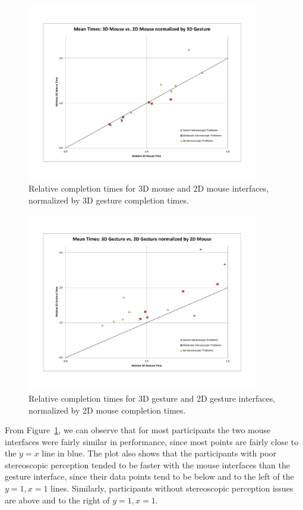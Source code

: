 \documentclass[pageno]{jpaper}
\begin{document}
\begin{figure}
\centering
\includegraphics[width=0.9\textwidth]{figures/f1.pdf}
\caption{Relative completion times for 3D mouse and 2D mouse interfaces,
normalized by 3D gesture completion times.}
\label{fig:mousevs3dg}
\end{figure}
\begin{figure}
\centering
\includegraphics[width=0.9\textwidth]{figures/f2.pdf}
\caption{Relative completion times for 3D gesture and 2D gesture interfaces,
normalized by 2D mouse completion times.}
\label{fig:gesturevs2dm}
\end{figure}

From Figure~\ref{fig:mousevs3dg}, we can observe that for most participants
the two mouse interfaces were fairly similar in performance, since most points
are fairly close to the $y = x$ line in blue. The plot also shows that the
participants with poor stereoscopic perception tended to be faster with the
mouse interfaces than the gesture interface, since their data points tend to be below
and to the left of the $y = 1, x = 1$ lines. Similarly, participants without
stereoscopic perception issues are above and to the right of $y = 1, x = 1$.
\end{document}
